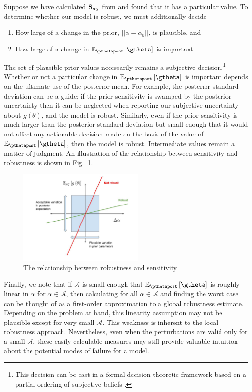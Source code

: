 \documentclass{article}\usepackage[]{graphicx}\usepackage[]{color}
\theoremstyle{definition}
\theoremstyle{plain}
\theoremstyle{plain}
\theoremstyle{plain}
\theoremstyle{definition}
\theoremstyle{plain}
\theoremstyle{plain}
\newcommand{\fig}[1]{Fig.~\ref{fig:#1}}
\begin{document}
Suppose we have calculated $\mathbf{S}_{\alpha_{0}}$ from 
and found that it has a particular value. To determine whether our
model is robust, we must additionally decide
\begin{enumerate}
\item How large of a change in the prior, $||\alpha-\alpha_{0}||$, is plausible,
and
\item How large of a change in $\epgtheta$ is important.
\end{enumerate}
The set of plausible prior values necessarily remains a subjective
decision.\footnote{This decision can be cast in a formal decision theoretic
framework based on a partial ordering of subjective beliefs
\citep{insua:2012:robustaxioms}.} Whether or not a particular change in
$\epgtheta$ is important depends on the ultimate use of the posterior mean. For
example, the posterior standard deviation can be a guide: if the prior
sensitivity is swamped by the posterior uncertainty then it can be neglected
when reporting our subjective uncertainty about $g\left(\theta\right)$, and the
model is robust. Similarly, even if the prior sensitivity is much larger than
the posterior standard deviation but small enough that it would not affect any
actionable decision made on the basis of the value of $\epgtheta$, then the
model is robust. Intermediate values remain a matter of judgment. An illustration
of the relationship between sensitivity and robustness is shown in
\fig{robustness_vs_sensitivity}.

\begin{figure}
\centering{}\includegraphics[width=0.56\textwidth]{static_images/sensitivity_use.jpg}
\caption{The relationship between robustness and sensitivity\label{fig:robustness_vs_sensitivity} }
\end{figure}

Finally, we note that if $\mathcal{A}$ is small enough that $\epgtheta$
is roughly linear in $\alpha$ for $\alpha\in\mathcal{A}$, then calculating
 for all $\alpha\in\mathcal{A}$ and
finding the worst case can be thought of as a first-order approximation
to a global robustness estimate. Depending on the problem at hand,
this linearity assumption may not be plausible except for very small
$\mathcal{A}$. This weakness is inherent to the local robustness
approach. Nevertheless, even when the perturbations are valid only
for a small $\mathcal{A}$, these easily-calculable measures may still
provide valuable intuition about the potential modes of failure for
a model.
\end{document}
